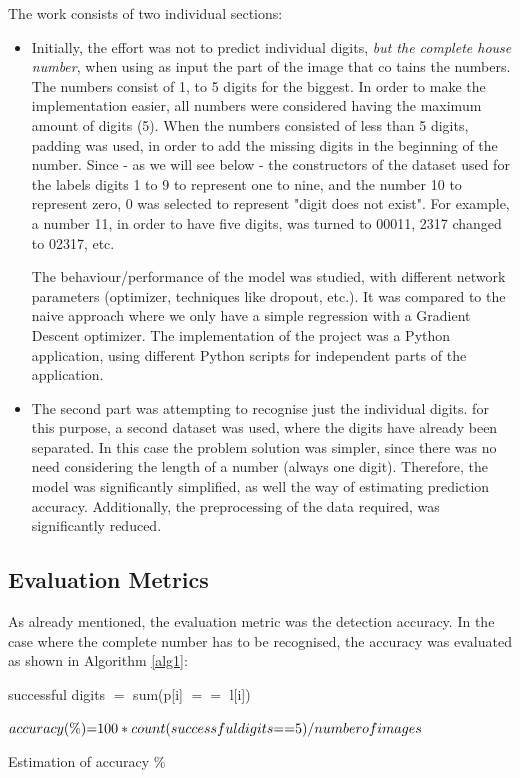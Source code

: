 \documentclass[final,12p,times]{elsarticle}
\providecommand{\SetAlgoLined}{\SetLine}
\begin{document}
The work consists of two individual sections:
\begin{itemize}
\item Initially, the effort was not to predict individual digits, \emph{but the complete house number}, when using as input the 
part of the image that co tains the numbers.
The numbers consist of 1, to 5 digits for the biggest.
In order to make the implementation easier, all numbers were considered having the maximum amount of digits (5).
When the numbers consisted of less than 5 digits, padding was used, in order to add the missing digits in the 
beginning of the number.
Since - as we will see below - the constructors of the dataset used for the labels digits 1 to 9 to represent one to nine,
and the number 10 to represent zero, 0 was selected to represent "digit does not exist".
For example, a number 11, in order to have five digits, was turned to 00011, 2317 changed to 02317, etc.

The behaviour/performance of the model was studied, with different network parameters (optimizer, techniques like dropout, 
etc.).
It was compared to the naive approach where we only have a simple regression with a Gradient Descent optimizer. 
The implementation of the project was a Python application, using different Python scripts for independent parts of the 
application.
\item The second part was attempting to recognise just the individual digits. for this purpose, a second dataset was used, where
the digits have already been separated.
In this case the problem solution was simpler, since there was no need considering the length of a number (always one digit).
Therefore, the model was significantly simplified, as well the way of estimating prediction accuracy.
Additionally, the preprocessing of the data required, was significantly reduced.
\end{itemize}

\subsection{Evaluation Metrics}
\label{sec:3.2}

As already mentioned, the evaluation metric was the detection accuracy.
In the case where the complete number has to be recognised, the accuracy was evaluated as shown in Algorithm \ref{alg1}:


\begin{algorithm}[H]
 \SetAlgoLined
   {
	successful digits $=$ sum(p[i] $=$$=$ l[i])}
	   
   \begin{math}accuracy(\%) $=$ 100 * count(successful digits $=$ $=$ 5) / number of images\end{math}
\caption{Estimation of accuracy \%}
\label{alg1}
\end{algorithm}
\end{document}

